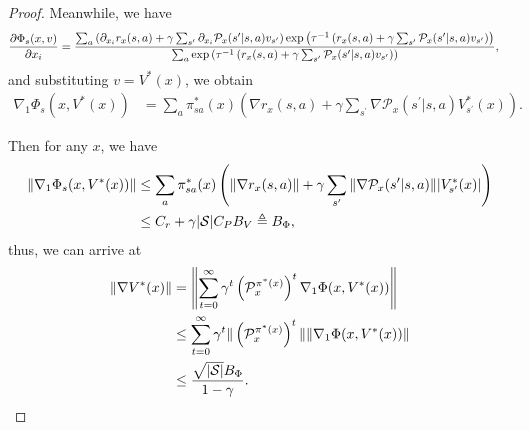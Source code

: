 \documentclass{article}
\theoremstyle{plain}
\theoremstyle{definition}
\theoremstyle{remark}
\def\cP{\mathcal P}
\def\cS{\mathcal S}
\def\bydef{\triangleq}
\begin{document}
\begin{proof}
    Meanwhile, we have
    \begin{align}
        \frac{\partial \Phi_s(x,v)}{\partial x_i} & = \frac{\sum_a \left( \partial_{x_i} r_x(s,a) + \gamma \sum_{s^\prime} \partial_{x_i} \cP_{x}(s^\prime|s,a) v_{s^\prime} \right)\exp\left(\tau^{-1} \left( r_x(s,a)+ \gamma \sum_{s^\prime}\cP_{x}(s^\prime|s,a) v_{s^\prime}\right) \right)}{\sum_{a} \exp\left(\tau^{-1} \left( r_x(s,a) + \gamma \sum_{s^\prime}\cP_{x}(s^\prime|s,a) v_{s^\prime}\right) \right)}, \notag
    \end{align}
    and substituting $v = V^*(x)$, we obtain
    \begin{align}
        \nabla_1 \Phi_s(x,V^*(x)) & = \sum_a \pi^*_{sa}(x) \left( \nabla r_x(s,a) + \gamma \sum_{s^\prime} \nabla \cP_{x}(s^\prime|s,a) V^*_{s^\prime}(x) \right).
    \end{align}

    Then for any $x$, we have
    \begin{align}
        \|\nabla_1 \Phi_s(x,V^*(x))\| & \leq \sum_a \pi^*_{sa}(x) \left( \| \nabla r_x(s,a) \| + \gamma \sum_{s^\prime} \| \nabla \cP_{x}(s^\prime|s,a) \| |V^*_{s^\prime}(x)| \right) \notag \\
        & \leq C_r + \gamma |\cS| C_P B_V \bydef B_\Phi,
    \end{align}
    thus, we can arrive at
    \begin{align}
        \|\nabla V^*(x) \| & = \left\| \sum_{t=0}^\infty \gamma^t  \left(\cP^{\pi^*(x)}_x\right)^t \nabla_1 \Phi(x,V^*(x))\right\| \notag \\
        & \leq \sum_{t=0}^\infty \gamma^t \|    \left(\cP^{\pi^*(x)}_{x}\right)^t  \| \|\nabla_1 \Phi(x,V^*(x))\| \notag \\
        & \leq \frac{\sqrt{|\cS|} B_\Phi}{1-\gamma}.
    \end{align}


\end{proof}
\end{document}

